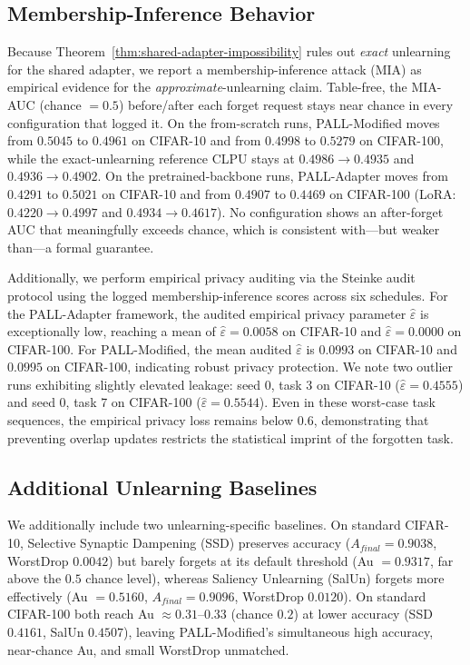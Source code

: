 \documentclass[conference]{IEEEtran}
\theoremstyle{plain}
\theoremstyle{definition}
\theoremstyle{remark}
\begin{document}
\subsection{Membership-Inference Behavior}
\label{subsec:mia}
Because Theorem~\ref{thm:shared-adapter-impossibility} rules out \emph{exact} unlearning for the shared adapter, we report a membership-inference attack (MIA) as empirical evidence for the \emph{approximate}-unlearning claim. Table-free, the MIA-AUC (chance \(=0.5\)) before/after each forget request stays near chance in every configuration that logged it. On the from-scratch runs, PALL-Modified moves from \(0.5045\) to \(0.4961\) on CIFAR-10 and from \(0.4998\) to \(0.5279\) on CIFAR-100, while the exact-unlearning reference CLPU stays at \(0.4986\!\to\!0.4935\) and \(0.4936\!\to\!0.4902\). On the pretrained-backbone runs, PALL-Adapter moves from \(0.4291\) to \(0.5021\) on CIFAR-10 and from \(0.4907\) to \(0.4469\) on CIFAR-100 (LoRA: \(0.4220\!\to\!0.4997\) and \(0.4934\!\to\!0.4617\)). No configuration shows an after-forget AUC that meaningfully exceeds chance, which is consistent with—but weaker than—a formal guarantee.

Additionally, we perform empirical privacy auditing via the Steinke audit protocol \cite{steinke2024privacy} using the logged membership-inference scores across six schedules. For the PALL-Adapter framework, the audited empirical privacy parameter $\hat{\varepsilon}$ is exceptionally low, reaching a mean of $\hat{\varepsilon} = 0.0058$ on CIFAR-10 and $\hat{\varepsilon} = 0.0000$ on CIFAR-100. For PALL-Modified, the mean audited $\hat{\varepsilon}$ is $0.0993$ on CIFAR-10 and $0.0995$ on CIFAR-100, indicating robust privacy protection. We note two outlier runs exhibiting slightly elevated leakage: seed 0, task 3 on CIFAR-10 ($\hat{\varepsilon} = 0.4555$) and seed 0, task 7 on CIFAR-100 ($\hat{\varepsilon} = 0.5544$). Even in these worst-case task sequences, the empirical privacy loss remains below $0.6$, demonstrating that preventing overlap updates restricts the statistical imprint of the forgotten task.

\subsection{Additional Unlearning Baselines}
\label{subsec:extra-baselines}
We additionally include two unlearning-specific baselines. On standard CIFAR-10, Selective Synaptic Dampening (SSD) \cite{foster2024ssd} preserves accuracy (\(A_{final}=0.9038\), WorstDrop \(0.0042\)) but barely forgets at its default threshold (Au \(=0.9317\), far above the \(0.5\) chance level), whereas Saliency Unlearning (SalUn) \cite{fan2024salun} forgets more effectively (Au \(=0.5160\), \(A_{final}=0.9096\), WorstDrop \(0.0120\)). On standard CIFAR-100 both reach Au \(\approx 0.31\)--\(0.33\) (chance \(0.2\)) at lower accuracy (SSD \(0.4161\), SalUn \(0.4507\)), leaving PALL-Modified's simultaneous high accuracy, near-chance Au, and small WorstDrop unmatched.
\end{document}
